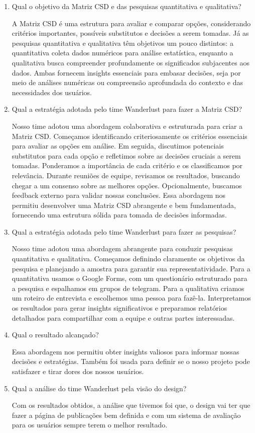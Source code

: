 \documentclass{article}
\begin{document}
\begin{enumerate}
      \item Qual o objetivo da Matriz CSD e das pesquisas quantitativa e qualitativa?

            A Matriz CSD é uma estrutura para avaliar e comparar opções, considerando critérios importantes, possíveis substitutos e decisões a serem tomadas. Já as pesquisas quantitativa e qualitativa têm objetivos um pouco distintos: a quantitativa coleta dados numéricos para análise estatística, enquanto a qualitativa busca compreender profundamente os significados subjacentes aos dados. Ambas fornecem insights essenciais para embasar decisões, seja por meio de análises numéricas ou compreensão aprofundada do contexto e das necessidades dos usuários.

      \item Qual a estratégia adotada pelo time Wanderlust para fazer a Matriz CSD?

            Nosso time adotou uma abordagem colaborativa e estruturada para criar a Matriz CSD. Começamos identificando criteriosamente os critérios essenciais para avaliar as opções em análise. Em seguida, discutimos potenciais substitutos para cada opção e refletimos sobre as decisões cruciais a serem tomadas. Ponderamos a importância de cada critério e os classificamos por relevância. Durante reuniões de equipe, revisamos os resultados, buscando chegar a um consenso sobre as melhores opções. Opcionalmente, buscamos feedback externo para validar nossas conclusões. Essa abordagem nos permitiu desenvolver uma Matriz CSD abrangente e bem fundamentada, fornecendo uma estrutura sólida para tomada de decisões informadas.

      \item Qual a estratégia adotada pelo time Wanderlust para fazer as pesquisas?

            Nosso time adotou uma abordagem abrangente para conduzir pesquisas quantitativa e qualitativa. Começamos definindo claramente os objetivos da pesquisa e planejando a amostra para garantir sua representatividade. Para a quantitativa usamos o Google Forms, com um questionário estruturado para a pesquisa e espalhamos em grupos de telegram. Para a qualitativa criamos um roteiro de entrevista e escolhemos uma pessoa para fazê-la. Interpretamos os resultados para gerar insights significativos e preparamos relatórios detalhados para compartilhar com a equipe e outras partes interessadas.

      \item Qual o resultado alcançado?

            Essa abordagem nos permitiu obter insights valiosos para informar nossas decisões e estratégias. Também foi usada para definir se o nosso projeto pode satisfazer e tirar dores dos nossos usuários.

      \item Qual a análise do time Wanderlust pela visão do design?

            Com os resultados obtidos, a análise que tivemos foi que, o design vai ter que fazer a página de publicações bem definida e com um sistema de avaliação para os usuários sempre terem o melhor resultado.

\end{enumerate}
\end{document}
